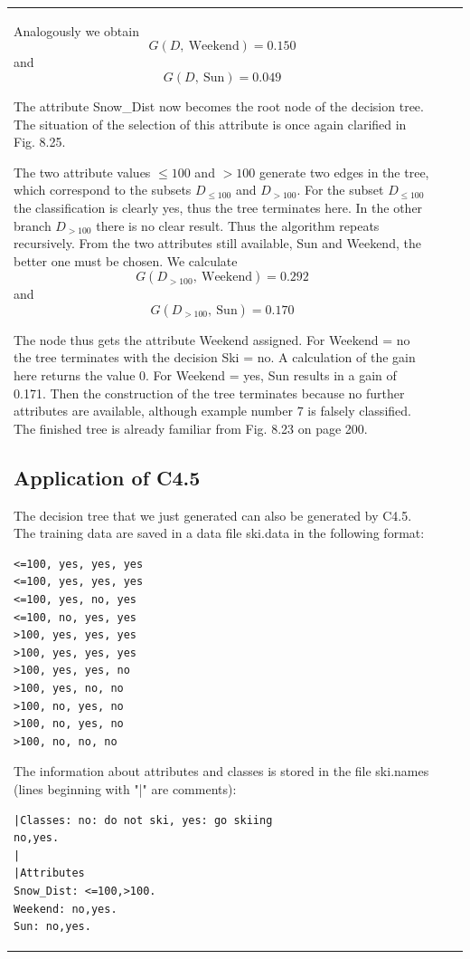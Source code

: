\documentclass[10pt]{book}
\begin{document}
\begin{center}
\begin{tabular}{|l|l|l|}
Analogously we obtain
$$
G(D,\ \text{Weekend}) = 0.150
$$
and
$$
G(D,\ \text{Sun}) = 0.049
$$

The attribute Snow\_Dist now becomes the root node of the decision tree. The situation of the selection of this attribute is once again clarified in Fig. 8.25.

The two attribute values $\leq 100$ and $>100$ generate two edges in the tree, which correspond to the subsets $D_{\leq 100}$ and $D_{>100}$. For the subset $D_{\leq 100}$ the classification is clearly yes, thus the tree terminates here. In the other branch $D_{>100}$ there is no clear result. Thus the algorithm repeats recursively. From the two attributes still available, Sun and Weekend, the better one must be chosen. We calculate
$$
G\left(D_{>100},\ \text{Weekend}\right) = 0.292
$$
and
$$
G\left(D_{>100},\ \text{Sun}\right) = 0.170
$$

The node thus gets the attribute Weekend assigned. For Weekend = no the tree terminates with the decision Ski = no. A calculation of the gain here returns the value 0. For Weekend = yes, Sun results in a gain of 0.171. Then the construction of the tree terminates because no further attributes are available, although example number 7 is falsely classified. The finished tree is already familiar from Fig. 8.23 on page 200.

\subsection{Application of C4.5}
The decision tree that we just generated can also be generated by C4.5. The training data are saved in a data file ski.data in the following format:
\begin{verbatim}
<=100, yes, yes, yes
<=100, yes, yes, yes
<=100, yes, no, yes
<=100, no, yes, yes
>100, yes, yes, yes
>100, yes, yes, yes
>100, yes, yes, no
>100, yes, no, no
>100, no, yes, no
>100, no, yes, no
>100, no, no, no
\end{verbatim}

The information about attributes and classes is stored in the file ski.names (lines beginning with "|" are comments):
\begin{verbatim}
|Classes: no: do not ski, yes: go skiing
no,yes.
|
|Attributes
Snow_Dist: <=100,>100.
Weekend: no,yes.
Sun: no,yes.
\end{verbatim}


\end{tabular}
\end{center}
\end{document}
